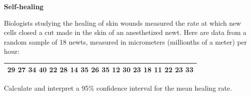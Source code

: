 \documentclass[a4paper, 12pt,twoside]{book}
\begin{document}
  \colorbox{champagne}{\parbox{\textwidth}{
 \textbf{Self-healing }\vspace{0.3cm}
 
 Biologists studying the healing of skin wounds measured the rate at which new cells closed a cut made in the skin of an anesthetized newt. Here are data from a random sample of 18 newts, measured in micrometers (millionths of a meter) per hour:
 \begin{table}[H]
 \centering
    \begin{tabular}{c}
     \hline
     29\hspace{0.2cm} 27\hspace{0.2cm} 34\hspace{0.2cm} 40\hspace{0.2cm} 22 \hspace{0.2cm}28 \hspace{0.2cm}14 \hspace{0.2cm}35\hspace{0.2cm} 26 \hspace{0.2cm}35 \hspace{0.2cm}12 \hspace{0.2cm}30 \hspace{0.2cm}23\hspace{0.2cm} 18 \hspace{0.2cm}11 \hspace{0.2cm}22 \hspace{0.2cm}23 \hspace{0.2cm}33\\
     \hline
    \end{tabular}
    \vspace{0.3cm}
     \end{table}
     
    Calculate and interpret a 95\% confidence interval for the mean healing rate.
 }}
 \newpage
\end{document}
